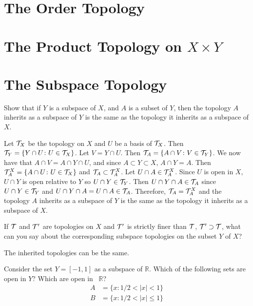 \section{The Order Topology}

\section{The Product Topology on \(X\times Y\)}

\section{The Subspace Topology}

\begin{exercise}
\item
  Show that if \(Y\) is a subspace of \(X\), and \(A\) is a subset of \(Y\),
  then the topology \(A\) inherits as a subspace of \(Y\) is the same as the
  topology it inherits as a subspace of \(X\).
  \par\smallskip
  Let \(\mathcal{T}_X\) be the topology on \(X\) and \(U\) be a basis of \(\mathcal{T}_X\).
  Then \(\mathcal{T}_Y = \{Y\cap U\colon U\in\mathcal{T}_X\}\).
  Let \(V = Y\cap U\).
  Then \(\mathcal{T}_A = \{A\cap V\colon V\in\mathcal{T}_Y\}\).
  We now have that \(A\cap V = A\cap Y\cap U\), and since
  \(A\subset Y\subset X\), \(A\cap Y = A\).
  Then \(\mathcal{T}_A^X = \{A\cap U\colon U\in \mathcal{T}_X\}\) and
  \(\mathcal{T}_A\subset\mathcal{T}_A^X\).
  Let \(U\cap A\in\mathcal{T}_A^X\).
  Since \(U\) is open in \(X\), \(U\cap Y\) is open relative to \(Y\) so
  \(U\cap Y\in\mathcal{T}_Y\).
  Then \(U\cap Y\cap A\in\mathcal{T}_A\) since \(U\cap Y\in\mathcal{T}_Y\) and
  \(U\cap Y\cap A = U\cap A\in\mathcal{T}_A\).
  Therefore, \(\mathcal{T}_A = \mathcal{T}_A^X\) and the topology \(A\) inherits as a
  subspace of \(Y\) is the same as the topology it inherits as a subspace of
  \(X\).
\item
  If \(\mathcal{T}\) and \(\mathcal{T}'\) are topologies on \(X\) and \(\mathcal{T}'\) is strictly
  finer than \(\mathcal{T}\), \(\mathcal{T}'\supset\mathcal{T}\), what can you say about the
  corresponding subspace topologies on the subset \(Y\) of \(X\)?
  \par\smallskip
  The inherited topologies can be the same.
\item
  Consider the set \(Y = [-1,1]\) as a subspace of \(\mathbb{R}\).
  Which of the following sets are open in \(Y\)? Which are open in \
  \(\mathbb{R}\)?
  \begin{align*}
    A & = \{x\colon 1/2 < \lvert x\rvert < 1\}\\
    B & = \{x\colon 1/2 < \lvert x\rvert\leq 1\}\\

\end{align*}
\end{exercise}
